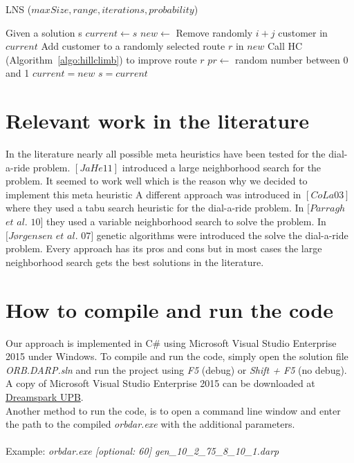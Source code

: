 \documentclass[fleqn]{scrartcl}
\begin{document}
\begin{algorithm}
\caption{LNS ($maxSize, range, iterations, probability$)}
\label{algo:lns}
\begin{algorithmic}[1]
\State Given a solution s
\State $current \gets s$
\State $new \gets$ Remove randomly $i+j$ customer in $current$
\State Add customer to a randomly selected route $r$ in $new$
\State Call HC (Algorithm~\ref{algo:hillclimb}) to improve route $r$
\EndFor
\State $pr \gets$ random number between 0 and 1
\State $current = new$
\State $s = current$
\EndIf
\EndIf
\EndIf
\EndFor
\EndFor
\EndFor
\end{algorithmic}
\end{algorithm}

\newpage
\section{Relevant work in the literature}
In the literature nearly all possible meta heuristics have been tested for the dial-a-ride problem. 
$[JaHe 11]$ introduced a large neighborhood search for the problem. It seemed to work well which is the reason why we decided to implement this meta heuristic A different approach was introduced in $[CoLa 03]$ where they used a tabu search heuristic for the dial-a-ride problem. In $[Parragh$  $et$  $al.$ $10]$ they used a variable neighborhood search to solve the problem. In $[Jørgensen$ $et$ $al.$ $07]$ genetic algorithms were introduced the solve the dial-a-ride problem.
Every approach has its pros and cons but in most cases the large neighborhood search gets the best solutions in the literature.

\section{How to compile and run the code}
Our approach is implemented in C\# using Microsoft Visual Studio Enterprise 2015 under Windows. To compile and run the code, simply open the solution file \textit{ORB.DARP.sln} and run the project using \textit{F5} (debug) or \textit{Shift + F5} (no debug). A copy of Microsoft Visual Studio Enterprise 2015 can be downloaded at \href{https://dreamspark.uni-paderborn.de/}{Dreamspark UPB}.
\\
Another method to run the code, is to open a command line window and enter the path to the compiled \textit{orbdar.exe} with the additional parameters.
\\\\
Example: \textit{orbdar.exe [optional: 60]  gen\_10\_2\_75\_8\_10\_1.darp}
\end{document}
